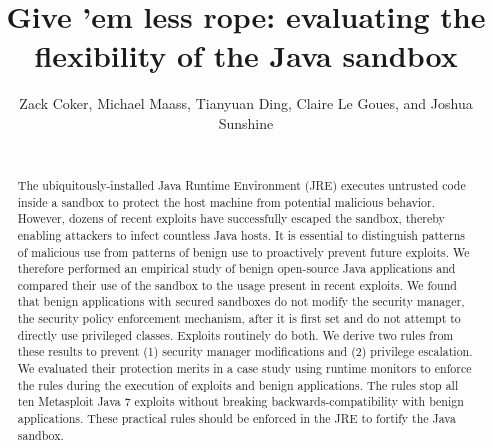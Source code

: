 \documentclass{sig-alternate}
\begin{document}
\lstset{language=Java}

\title{Give 'em less rope: evaluating the flexibility of the Java sandbox}

\author{\alignauthor Zack Coker, Michael Maass, Tianyuan Ding, Claire Le Goues, and Joshua Sunshine \\
 \\
} 

\maketitle
\thispagestyle{plain} 
\pagestyle{plain}
\begin{abstract}
The ubiquitously-installed Java Runtime Environment (JRE) executes
untrusted code inside a sandbox to protect the host machine from potential
malicious behavior. However, dozens of recent exploits have successfully
escaped the sandbox, thereby enabling attackers to infect countless
Java hosts. It is essential to distinguish patterns of malicious use
from patterns of benign use to proactively prevent future exploits.
We therefore performed an empirical study of benign open-source Java
applications and compared their use of the sandbox to the usage present
in recent exploits. We found that benign applications with secured
sandboxes do not modify the security manager, the security policy
enforcement mechanism, after it is first set and do not attempt to
directly use privileged classes. Exploits routinely do both. We derive two rules from these results to prevent (1) security manager modifications and (2) privilege escalation. We evaluated their protection merits in a case study using runtime monitors to enforce the rules during the execution of exploits and benign applications. The rules stop all ten Metasploit Java 7 exploits without breaking backwards-compatibility with benign applications. These practical rules should be enforced in the JRE to fortify the Java sandbox.
\end{abstract}
\end{document}
